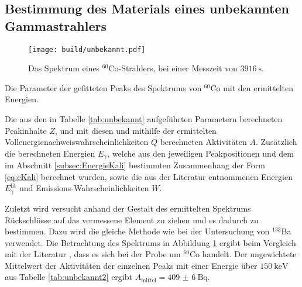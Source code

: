 \subsection{Bestimmung des Materials eines unbekannten Gammastrahlers}
\begin{figure}
	\centering
	\texttt{[image: build/unbekannt.pdf]}
	\caption{Das Spektrum eines $^{60}$Co-Strahlers, bei einer Messzeit von $\SI{3916}{\second}$.}
	\label{fig:4}
\end{figure}
\begin{table}
	\centering
	\caption{Die Parameter der gefitteten Peaks des Spektrums von $^{60}$Co mit den ermittelten Energien.}
	
\end{table}
\begin{table}
	\centering
	\caption{Die aus den in Tabelle \ref{tab:unbekannt} aufgeführten Parametern berechneten Peakinhalte $Z$, und mit diesen und mithilfe der ermittelten Vollenergienachweiswahrscheinlichkeiten $Q$ berechneten Aktivitäten $A$. Zusätzlich die berechneten Energien $E_\gamma$, welche aus den jeweiligen Peakpositionen und dem im Abschnitt \ref{subsec:EnergieKali} bestimmten Zusammenhang der Form \eqref{eq:eKali} berechnet wurden, sowie die aus der Literatur entnommenen Energien $E_\gamma^\text{lit}$ und Emissions-Wahrscheinlichkeiten $W$.}
	
\end{table}
Zuletzt wird versucht anhand der Gestalt des ermittelten Spektrums Rückschlüsse auf das vermessene Element zu ziehen und es dadurch zu bestimmen. Dazu wird die gleiche Methode wie bei der Untersuchung von $^{133}$Ba verwendet. Die Betrachtung des Spektrums in Abbildung \ref{fig:4} ergibt beim Vergleich mit der Literatur \cite{BROWNE20131849}, dass es sich bei der Probe um $^{60}$Co handelt. Der ungewichtete Mittelwert der Aktivitäten der einzelnen Peaks mit einer Energie über $\SI{150}{\kilo\electronvolt}$ aus Tabelle \ref{tab:unbekannt2} ergibt $A_\text{mittel} = \SI{409(6)}{\becquerel}$.
